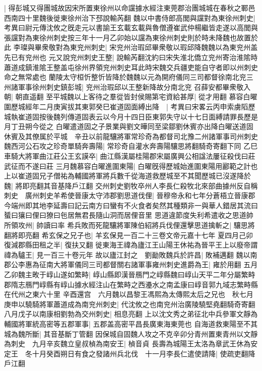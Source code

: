 |{
	得彭城又得團城故因宋所置東徐州以命讜據水經注東莞郡治團城城在春秋之鄆邑西南四十里魏後徙東徐州治下邳說輸芮翻}
魏以中書侍郎高閭與讜對為東徐州刺史|{
	考異曰尉元傳沈攸之旣走元以書諭王玄載玄載與魯僧遵崔武仲楊繼皆走遂以高閭與張讜對為東徐州刺史按三年十一月乙卯始以讜為東徐州刺史則於時未降魏也故置於此}
李璨與畢衆敬對為東兖州刺史|{
	宋兖州治瑕邱畢衆敬以瑕邱降魏魏以為東兖州盖先已有兖州也}
元又說兖州刺史王整|{
	說輸芮翻沈約曰宋失淮北僑立兖州寄治淮隂時蕭道成鎮淮隂王整盖屯徐州界領兖州刺史耳此時宋魏交兵疆吏能自守者即以州刺史命之無常處也}
蘭陵太守桓忻整忻皆降於魏魏以元為開府儀同三司都督徐南北兖三州諸軍事徐州刺史鎮彭城|{
	兖州治瑕邱以王整新降故分南北兖}
召薛安都畢衆敬入朝|{
	朝直遥翻}
至平城魏以上客待之羣從皆封侯賜第宅資給甚厚|{
	從才用翻}
慕容白曜圍歷城經年二月庚寅拔其東郭癸巳崔道固面縛出降　|{
	考異曰宋畧云丙申索虜䧟歷城執崔道固按後魏列傳道固表云以今月十四日臣東郭失守以十七日面縛請罪長歷是月丁丑朔今從之}
白曜遣道固之子景業與劉文曄同至梁鄒劉休賓亦出降白曜送道固休賓及其僚属於平城　辛丑以前龍驤將軍常珍奇為都督司北豫二州諸軍事司州刺史魏西河公石攻之珍奇單騎奔壽陽|{
	常珍奇自灌水奔壽陽驤思將翻騎奇寄翻下同}
乙巳車騎大將軍曲江莊公王玄謨卒|{
	曲江縣漢屬桂陽郡宋屬廣興公相諡法屢征殺伐曰莊武征而不遂曰莊}
三月魏慕容白曜進圍東陽|{
	白曜旣得歷城始進圍東陽用酈範之計也}
上以崔道固兄子僧祐為輔國將軍將兵數千從海道救歷城至不其聞歷城已沒遂降於魏|{
	將即亮翻其音基降戶江翻}
交州刺史劉牧卒州人李長仁殺牧北來部曲據州反自稱刺史　廣州刺史羊希使晉康太守沛郡劉思道伐俚|{
	晉穆帝永和七年分蒼梧立晉康郡今端州即其地李延壽曰記云南方曰蠻有不火食者矣然其種類非一與華人錯居其流曰蜑曰獽曰俚曰獠曰㐌居無君長隨山洞而居俚音里}
思道違節度失利希遣收之思道帥所領攻州|{
	帥讀曰率}
希兵敗而死龍驤將軍陳伯紹將兵伐俚還擊思道擒斬之|{
	驤思將翻將即亮翻}
希玄保之兄子也|{
	羊玄保見一百二十三卷文帝元嘉十七年}
夏四月己卯復減郡縣田租之半|{
	復扶又翻}
徙東海王禕為廬江王山陽王休祐為晉平王上以廢帝謂禕為驢王|{
	見一百三十卷元年}
故以廬江封之　劉勔敗魏兵於許昌|{
	敗補邁翻}
魏以南郡公李惠為征南大將軍儀同三司都督關右諸軍事雍州刺史進爵為王|{
	雍於用翻}
五月乙卯魏主畋于崞山遂如繁畤|{
	崞山縣即漢晉鴈門之崞縣魏曰崞山天平二年分屬繁畤郡隋志鴈門崞縣有崞山據水經注山在繁畤之西灅水之南孟康曰崞音郭九域志繁畤縣在代州之東六十里}
辛酉還宫　六月魏以昌黎王馮熙為太傳熙太后之兄也　秋七月庚申以驍騎將軍蕭道成為南兖州刺史|{
	代沈攸之也南兖州治廣陵驍堅堯翻騎奇寄翻}
八月戊子以南康相劉勃為交州刺史|{
	相息亮翻}
上以沈文秀之弟征北中兵參軍文靜為輔國將軍統高密等五郡軍事|{
	五郡盖高密平昌長廣東海東莞也}
自海道救東陽至不其城為魏所斷|{
	其音基斷丁管翻}
因保城自固魏人攻之不克辛卯分青州置東青州以文靜為刺史　九月辛亥魏立皇叔楨為南安王|{
	楨音貞}
長壽為城陽王太洛為章武王休為安定王　冬十月癸酉朔日有食之發諸州兵北伐　十一月李長仁遣使請降|{
	使疏吏翻降戶江翻}
